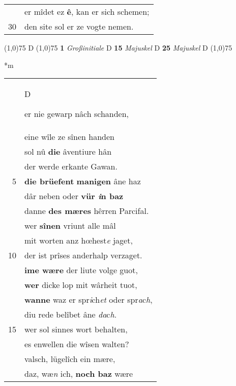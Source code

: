 \documentclass[8pt,a4paper,notitlepage]{article}
\begin{document}
\begin{table}[ht]
\begin{minipage}[t]{0.5\linewidth}
\begin{tabular}{rl}
 & er mîdet ez \textbf{ê}, kan er sich schemen;\\ 
30 & den site sol er ze vogte nemen.\\ 
\end{tabular}
\scriptsize
\line(1,0){75} \newline
D \newline
\line(1,0){75} \newline
\textbf{1} \textit{Großinitiale} D  \textbf{15} \textit{Majuskel} D  \textbf{25} \textit{Majuskel} D  \newline
\line(1,0){75} \newline
\newline
\end{minipage}
\hspace{0.5cm}
\begin{minipage}[t]{0.5\linewidth}
\small
\begin{center}*m
\end{center}
\begin{tabular}{rl}
 & \begin{large}D\end{large}er nie gewarp nâch schanden,\\ 
 & eine wîle ze sînen handen\\ 
 & sol nû \textbf{die} âventiure hân\\ 
 & der werde erkante Gawan.\\ 
5 & \textbf{die brüefent} \textbf{manigen} âne haz\\ 
 & dâr neben oder \textbf{vür \textit{i}n baz}\\ 
 & danne \textbf{des mæres} hêrren Parcifal.\\ 
 & wer \textbf{sînen} vriunt alle mâl\\ 
 & mit worten anz hœhest\textit{e} jaget,\\ 
10 & der ist prîses anderhalp verzaget.\\ 
 & \textbf{ime wære} der liute volge guot,\\ 
 & \textbf{wer} dicke lop mit wârheit tuot,\\ 
 & \textbf{wanne} waz er spr\textit{i}ch\textit{et} oder spr\textit{a}c\textit{h},\\ 
 & diu rede belîbet âne \textit{da}c\textit{h}.\\ 
15 & wer sol sinnes wort behalten,\\ 
 & es enwellen die wîsen walten?\\ 
 & valsch, lügelîch ein mære,\\ 
 & daz, wæ\textit{n} ich, \textbf{noch baz} wære\\ 

\end{tabular}
\end{minipage}
\end{table}
\end{document}
